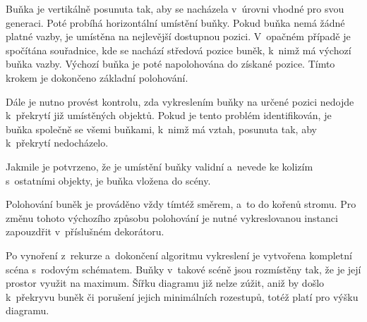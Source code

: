 		Buňka je vertikálně posunuta tak, aby se nacházela v~úrovni vhodné pro svou generaci. Poté probíhá horizontální umístění buňky. Pokud buňka nemá žádné platné vazby, je umístěna na nejlevější dostupnou pozici. V~opačném případě je spočítána souřadnice, kde se nachází středová pozice buněk, k~nimž má výchozí buňka vazby. Výchozí buňka je poté napolohována do získané pozice. Tímto krokem je dokončeno základní polohování. \par
		Dále je nutno provést kontrolu, zda vykreslením buňky na určené pozici nedojde k~překrytí již umístěných objektů. Pokud je tento problém identifikován, je buňka společně se všemi buňkami, k~nimž má vztah, posunuta tak, aby k~překrytí nedocházelo. \par
		Jakmile je potvrzeno, že je umístění buňky validní a~nevede ke kolizím s~ostatními objekty, je buňka vložena do scény. \par
		Polohování buněk je prováděno vždy tímtéž směrem, a~to do kořenů stromu. Pro změnu tohoto výchozího způsobu polohování je nutné vykreslovanou instanci zapouzdřit v~příslušném dekorátoru.\par
		Po vynoření z~rekurze a~dokončení algoritmu vykreslení je vytvořena kompletní scéna s~rodovým schématem. Buňky v~takové scéně jsou rozmístěny tak, že je její prostor využit na maximum. Šířku diagramu již nelze zúžit, aniž by došlo k~překryvu buněk či porušení jejich minimálních rozestupů, totéž platí pro výšku diagramu.\par 
		
